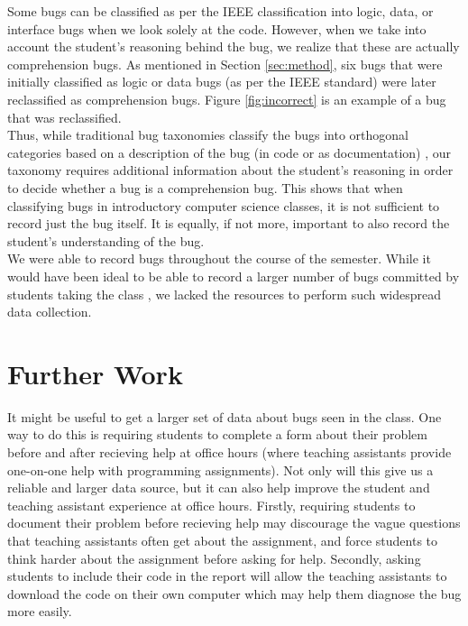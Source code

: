 \documentclass{sig-alternate}
\begin{document}
Some bugs can be classified as per the IEEE classification into logic, data, or interface bugs when we look solely at the code. However, when we take into account the student's reasoning behind the bug, we realize that these are actually comprehension bugs. As mentioned in Section \ref{sec:method}, six bugs that were initially classified as logic or data bugs (as per the IEEE standard) were later reclassified as comprehension bugs. Figure \ref{fig:incorrect} is an example of a bug that was reclassified.\\

Thus, while traditional bug taxonomies classify the bugs into orthogonal categories based on a description of the bug (in code or as documentation) \cite{Beizer90}, our taxonomy requires additional information about the student's reasoning in order to decide whether a bug is a comprehension bug. This shows that when classifying bugs in introductory computer science classes, it is not sufficient to record just the bug itself. It is equally, if not more, important to also record the student's understanding of the bug.\\

We were able to record \numtotal bugs throughout the course of the semester. While it would have been ideal to be able to record a larger number of bugs committed by students taking the class \cite{BryceCooleyHansenHayrapetyan10}, we lacked the resources to perform such widespread data collection.


\section{Further Work}
It might be useful to get a larger set of data about bugs seen in the class. One way to do this is requiring students to complete a form about their problem before and after recieving help at office hours (where teaching assistants provide one-on-one help with programming assignments). Not only will this give us a reliable and larger data source, but it can also help improve the student and teaching assistant experience at office hours. Firstly, requiring students to document their problem before recieving help may discourage the vague questions that teaching assistants often get about the assignment, and force students to think harder about the assignment before asking for help. Secondly, asking students to include their code in the report will allow the teaching assistants to download the code on their own computer which may help them diagnose the bug more easily.\\
\end{document}
